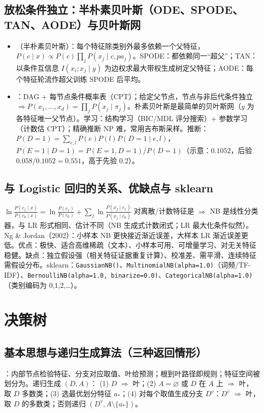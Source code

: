 \subsection{放松条件独立：半朴素贝叶斯（ODE、SPODE、TAN、AODE）与贝叶斯网}
\begin{itemize}
\item {}（半朴素贝叶斯）：每个特征除类别外最多依赖一个父特征，$P(c\mid x)\propto P(c)\prod_jP(x_j\mid c,pa_j)$。SPODE：都依赖同一“超父”；TAN：以条件互信息 $I(x_i;x_j\mid y)$ 为边权求最大带权生成树定父特征；AODE：每个特征轮流作超父训练 SPODE 后平均。
\item {}：DAG + 每节点条件概率表（CPT）；给定父节点，节点与非后代条件独立 $\Rightarrow P(x_1,\dots,x_d)=\prod_jP(x_j\mid\pi_j)$。朴素贝叶斯是最简单的贝叶斯网（$y$ 为各特征唯一父节点）。学习：结构学习（BIC/MDL 评分搜索）+ 参数学习（计数估 CPT）；精确推断 NP 难，常用吉布斯采样。推断：$P(D{=}1)=\sum_{e,l}P(e)P(l)P(D{=}1\mid e,l)$，$P(E{=}1\mid D{=}1)=P(E{=}1,D{=}1)/P(D{=}1)$（示意：$0.1052$，后验 $0.058/0.1052=0.551$，高于先验 0.2）。
\end{itemize}

\subsection{与 Logistic 回归的关系、优缺点与 sklearn}
$\ln\frac{P(c_1\mid x)}{P(c_0\mid x)}=\ln\frac{P(c_1)}{P(c_0)}+\sum_j\ln\frac{P(x_j\mid c_1)}{P(x_j\mid c_0)}$ 对离散/计数特征是 $\Rightarrow$ NB 是线性分类器，与 LR 形式相同、估计不同（NB 生成式计数闭式；LR 最大化条件似然）。Ng \& Jordan（2002）：小样本 NB 更快接近渐近误差，大样本 LR 渐近误差更低。优点：极快、适合高维稀疏（文本）、小样本可用、可增量学习、对无关特征稳健。缺点：独立假设强（相关特征证据重复计算）、校准差、需平滑、连续特征需假设分布。sklearn：\texttt{GaussianNB()}、\texttt{MultinomialNB(alpha=1.0)}（词频/TF-IDF）、\texttt{BernoulliNB(alpha=1.0, binarize=0.0)}、\texttt{CategoricalNB(alpha=1.0)}（类别编码为 0,1,2,\dots）。

\section{决策树}

\subsection{基本思想与递归生成算法（三种返回情形）}
：内部节点检验特征、分支对应取值、叶给预测；根到叶路径即规则；特征空间被划分为。递归生成 $(D,A)$：
(1) $D$  $\Rightarrow$ 叶；(2) $A=\varnothing$ 或 $D$ 在 $A$ 上 $\Rightarrow$ 叶，取 $D$ 多数类；(3) 选最优划分特征 $a_*$；(4) 对每个取值生成分支 $D^v$：$D^v$  $\Rightarrow$ 叶，取 $D$ 的多数类；否则递归 $(D^v,A\setminus\{a_*\})$。


